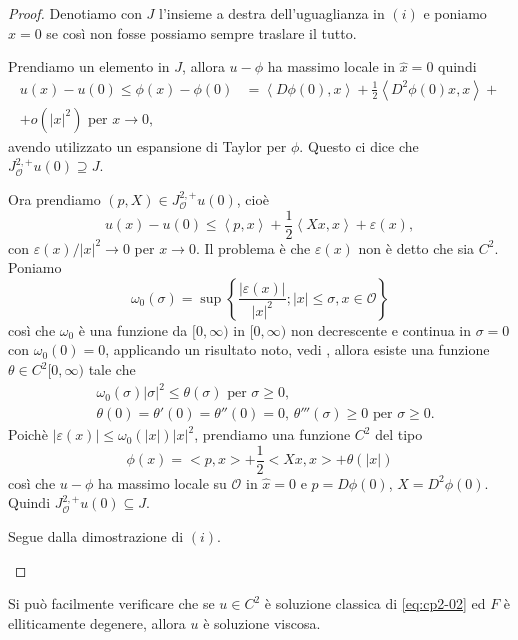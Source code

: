 \begin{osservazione}
\begin{proof}
Denotiamo con $J$ l'insieme a destra dell'uguaglianza in $(i)$ e poniamo $\hat{x}=0$ se così non fosse possiamo sempre traslare il tutto.
\begin{enumi}
\item  Prendiamo un elemento in $J$, allora $u-\phi$ ha massimo locale in $\hat{x}=0$ quindi
\[
\begin{aligned}
u(x) - u(0)\leq\phi(x) -\phi(0)&=\left<D\phi(0),x\right> + \frac{1}{2}\left<D^2\phi(0)x,x\right> +\\
+ o(|x|^2)\text{ per }x\to 0,
\end{aligned}
\]
avendo utilizzato un espansione di Taylor per $\phi$. Questo ci dice che $J_{\mathcal{O}}^{2,+}u(0)\supseteq J$.

Ora prendiamo $(p,X)\in J_{\mathcal{O}}^{2,+}u(0)$, cioè
\[
u(x) - u(0)\leq\left<p,x\right> + \frac{1}{2}\left<Xx,x\right> + \varepsilon(x),
\]
con $\varepsilon(x)/|x|^2\to 0$ per $x\to 0$.
Il problema è che $\varepsilon(x)$ non è detto che sia $C^2$. Poniamo 
\[
\omega_0(\sigma)=\sup\left\{\frac{|\varepsilon(x)|}{|x|^2}; |x|\leq\sigma,x\in\mathcal{O}\right\}
\]
così che $\omega_0$ è una funzione da $[0,\infty)$ in $[0,\infty)$ non
    decrescente e continua in $\sigma=0$ con $\omega_0(0)=0$,
    applicando un risultato noto, vedi \cite[][§2 Lemma 2.1.9]{giga:main}, allora esiste una funzione $\theta\in C^2[0,\infty)$ tale che
\[
\begin{aligned}
&\omega_0(\sigma)|\sigma|^2\leq\theta(\sigma)\text{ per }\sigma\geq 0,\\
&\theta(0)=\theta'(0)=\theta''(0)=0,\,\theta'''(\sigma)\geq 0\text{ per }\sigma\geq 0.
\end{aligned}
\]
Poichè $|\varepsilon(x)|\leq\omega_0(|x|)|x|^2$, prendiamo una funzione $C^2$ del tipo
\[
\phi(x)=<p,x> + \frac{1}{2}<Xx,x> +\theta(|x|)
\]
così che $u-\phi$ ha massimo locale su $\mathcal{O}$ in $\hat{x}=0$ e $p=D\phi(0)$, $X=D^2\phi(0)$. Quindi $J_{\mathcal{O}}^{2,+}u(0)\subseteq J$.
\item  Segue dalla dimostrazione di $(i)$.
\end{enumi}
\end{proof}

\end{osservazione}

\begin{osservazione}
Si può facilmente verificare che se $u\in C^2$ è soluzione classica di \eqref{eq:cp2-02} ed $F$ è elliticamente degenere, allora $u$ è soluzione viscosa.
\end{osservazione}

